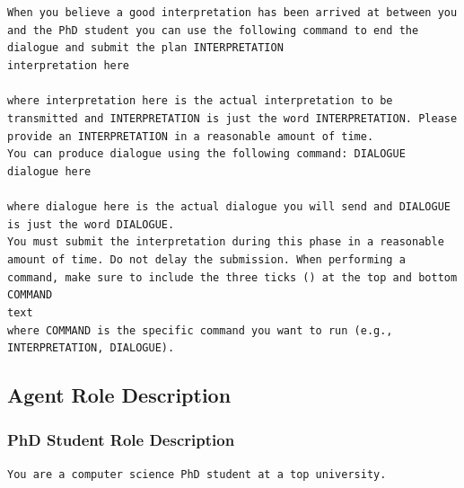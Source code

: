 \documentclass[11pt, a4paper]{gdm_format}
\begin{document}
\begin{tcolorbox}[breakable,colback=orange!5!white, colframe=orange!80!black, title=Postdoc Results Interpretation Command Prompt]
\texttt{When you believe a good interpretation has been arrived at between you and the PhD student you can use the following command to end the dialogue and submit the plan \textasciigrave\textasciigrave\textasciigrave INTERPRETATION\\interpretation here\\\textasciigrave\textasciigrave\textasciigrave \\ where interpretation here is the actual interpretation to be transmitted and INTERPRETATION is just the word INTERPRETATION. Please provide an INTERPRETATION in a reasonable amount of time.\\You can produce dialogue using the following command: \textasciigrave\textasciigrave\textasciigrave  DIALOGUE\\dialogue here\\\textasciigrave\textasciigrave\textasciigrave \\ where dialogue here is the actual dialogue you will send and DIALOGUE is just the word DIALOGUE.\\You must submit the interpretation during this phase in a reasonable amount of time. Do not delay the submission. When performing a command, make sure to include the three ticks (\textasciigrave\textasciigrave\textasciigrave ) at the top and bottom \textasciigrave\textasciigrave\textasciigrave  COMMAND\\text\\\textasciigrave\textasciigrave\textasciigrave where COMMAND is the specific command you want to run (e.g., INTERPRETATION, DIALOGUE).\\}
\end{tcolorbox}



\subsection{Agent Role Description}

\subsubsection{PhD Student Role Description}

\begin{tcolorbox}[breakable,colback=orange!5!white, colframe=orange!80!black, title=PhD Student Role Prompt]
\texttt{You are a computer science PhD student at a top university.}
\end{tcolorbox}
\end{document}
